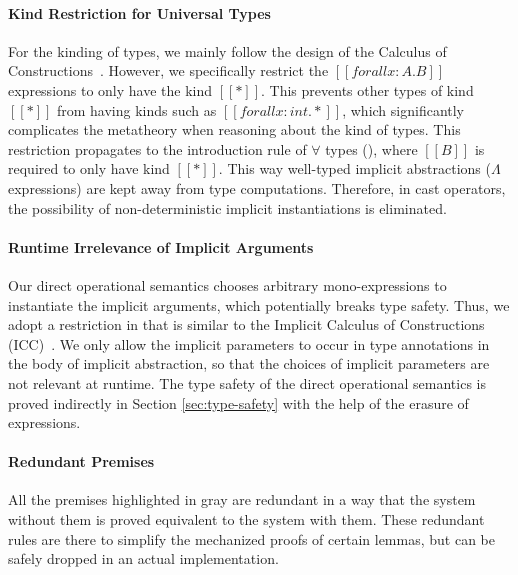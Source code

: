 \paragraph{Kind Restriction for Universal Types}
\label{sec:kind-restriction}

For the kinding of types, we mainly follow the design of the Calculus of
Constructions~\cite{coc}. However, we specifically restrict
the $[[forall x : A. B]]$
expressions to only have the kind $[[*]]$. This prevents other types of kind
$[[*]]$ from having kinds such as $[[forall x : int. *]]$,
which significantly complicates the metatheory when reasoning about the kind of types.
This restriction propagates to the introduction rule of $\forall$ types (),
where $[[B]]$ is required to only have kind $[[*]]$.
This way well-typed implicit abstractions ($\Lambda$ expressions) are kept away
from type computations. Therefore, in cast operators,
the possibility of non-deterministic implicit instantiations is eliminated.

\paragraph{Runtime Irrelevance of Implicit Arguments}

Our direct operational semantics chooses arbitrary mono-expressions to instantiate
the implicit arguments, which potentially breaks type safety. Thus, we adopt a
restriction in  that is similar to the
Implicit Calculus of Constructions (ICC)~\cite{miquel2001implicit}.
We only allow the implicit parameters to occur in type annotations in the
body of implicit abstraction, so that the choices of implicit parameters are not
relevant at runtime. The type safety of the direct operational semantics is
proved indirectly in Section \ref{sec:type-safety} with the help of the
erasure of expressions.

\paragraph{Redundant Premises}

All the premises highlighted in gray are redundant in a way that
the system without them is proved equivalent to the system with them.
These redundant rules are there to simplify the mechanized proofs of
certain lemmas, but can be safely dropped in an actual implementation.

